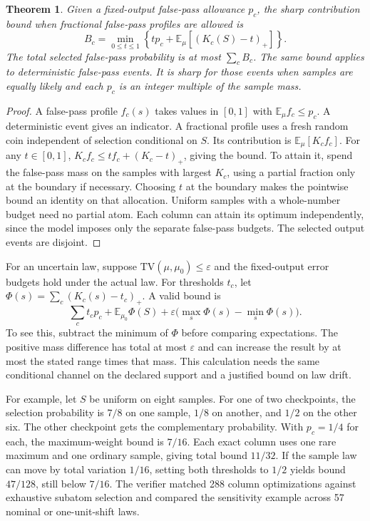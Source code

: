 \documentclass[11pt]{article}
\newtheorem{theorem}{Theorem}
\begin{document}
\begin{theorem}
Given a fixed-output false-pass allowance $p_c$, the sharp
contribution bound when fractional false-pass profiles are allowed is
\[
 B_c=\min_{0\le t\le1}\left\{t p_c+
              \mathbb E_\mu[(K_c(S)-t)_+]\right\}.
\]
The total selected false-pass probability is at most $\sum_c B_c$.
The same bound applies to deterministic false-pass events. It is
sharp for those events when samples are equally likely and each
$p_c$ is an integer multiple of the sample mass.
\end{theorem}
\begin{proof}
A false-pass profile $f_c(s)$ takes values in $[0,1]$ with
$\mathbb E_\mu f_c\le p_c$. A deterministic event gives an
indicator. A fractional profile uses a fresh random coin
independent of selection conditional on $S$. Its contribution is
$\mathbb E_\mu[K_c f_c]$. For any $t\in[0,1]$,
$K_c f_c\le t f_c+(K_c-t)_+$, giving the bound. To attain it,
spend the false-pass mass on the samples with largest $K_c$,
using a partial fraction only at the boundary if necessary.
Choosing $t$ at the boundary makes the pointwise bound an
identity on that allocation. Uniform samples with a whole-number
budget need no partial atom. Each column can attain its optimum
independently, since the model imposes only the separate
false-pass budgets. The selected output events are disjoint.
\end{proof}

For an uncertain law, suppose $\mathrm{TV}(\mu,\mu_0)\le\varepsilon$
and the fixed-output error budgets hold under the actual law.
For thresholds $t_c$, let $\Phi(s)=\sum_c(K_c(s)-t_c)_+$.
A valid bound is
\[
 \sum_c t_c p_c+\mathbb E_{\mu_0}\Phi(S)
      +\varepsilon\bigl(\max_s\Phi(s)-\min_s\Phi(s)\bigr).
\]
To see this, subtract the minimum of $\Phi$ before comparing
expectations. The positive mass difference has total at most
$\varepsilon$ and can increase the result by at most the stated
range times that mass. This calculation needs the same conditional
channel on the declared support and a justified bound on law drift.

For example, let $S$ be uniform on eight samples. For one of two
checkpoints, the selection probability is $7/8$ on one sample,
$1/8$ on another, and $1/2$ on the other six. The other checkpoint
gets the complementary probability. With $p_c=1/4$ for each,
the maximum-weight bound is $7/16$. Each exact column uses one
rare maximum and one ordinary sample, giving total bound $11/32$.
If the sample law can move by total variation $1/16$, setting
both thresholds to $1/2$ yields bound $47/128$, still below $7/16$.
The verifier matched 288 column optimizations against exhaustive
subatom selection and compared the sensitivity example across
57 nominal or one-unit-shift laws.
\end{document}
